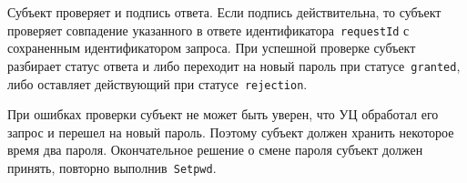 Субъект проверяет  и подпись ответа. Если подпись 
действительна, то субъект проверяет совпадение указанного в ответе 
идентификатора~\texttt{requestId} с сохраненным идентификатором запроса. 
При успешной проверке субъект разбирает статус ответа и либо переходит 
на новый пароль при статусе~\texttt{granted}, либо оставляет действующий
при статусе~\texttt{rejection}. 

При ошибках проверки субъект не может быть уверен, что УЦ обработал
его запрос и перешел на новый пароль. Поэтому субъект должен хранить  
некоторое время два пароля. Окончательное решение о смене пароля 
субъект должен принять, повторно выполнив~\texttt{Setpwd}.
